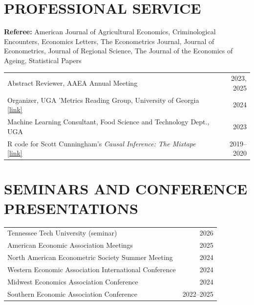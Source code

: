\documentclass[11pt,letterpaper]{article}
\begin{document}
\section*{PROFESSIONAL SERVICE}
\textbf{Referee:} American Journal of Agricultural Economics, Criminological Encounters, Economics Letters, The Econometrics Journal, Journal of Econometrics, Journal of Regional Science, The Journal of the Economics of Ageing, Statistical Papers

\vspace{4pt}
\begin{tabularx}{\textwidth}{Xr}
    Abstract Reviewer, AAEA Annual Meeting & 2023, 2025 \\
    Organizer, UGA 'Metrics Reading Group, University of Georgia \href{https://uga-metrics.github.io/}{[link]} & 2024 \\
    Machine Learning Consultant, Food Science and Technology Dept., UGA & 2023 \\
    R code for Scott Cunningham's \textit{Causal Inference: The Mixtape} \href{https://mixtape.scunning.com/}{[link]} & 2019--2020 \\
\end{tabularx}

\section*{SEMINARS AND CONFERENCE PRESENTATIONS}
\begin{tabularx}{\textwidth}{Xr}
    Tennessee Tech University (seminar) & 2026 \\
    American Economic Association Meetings & 2025 \\
    North American Econometric Society Summer Meeting & 2024 \\
    Western Economic Association International Conference & 2024 \\
    Midwest Economics Association Conference & 2024 \\
    Southern Economic Association Conference & 2022--2025 \\
\end{tabularx}

\end{document}
